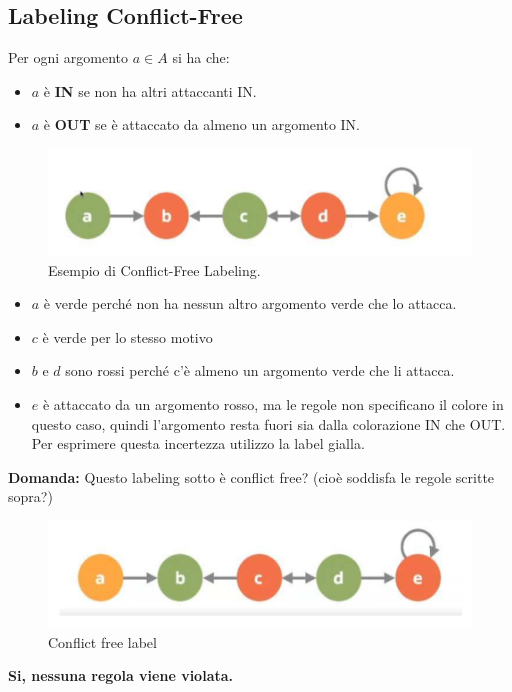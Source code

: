 \subsection{Labeling Conflict-Free}
Per ogni argomento $a \in A$ si ha che:
\begin{itemize}
    \item $a$ è \textbf{IN} se non ha altri attaccanti IN.
    \item $a$ è \textbf{OUT} se è attaccato da almeno un argomento IN.
\end{itemize}
\begin{figure}[H]
    \centering
    \includegraphics[width=12cm, keepaspectratio]{img/Cap7/CF.png}
    \caption{Esempio di Conflict-Free Labeling.}
\end{figure}
\begin{itemize}
    \item $a$ è verde perché non ha nessun altro argomento verde che lo
          attacca.
    \item $c$ è verde per lo stesso motivo
    \item $b$ e $d$ sono rossi perché c'è almeno un argomento verde che li
          attacca.
    \item $e$ è attaccato da un argomento rosso, ma le regole non
          specificano il colore in questo caso, quindi l'argomento resta fuori sia
          dalla colorazione IN che OUT. Per esprimere questa incertezza utilizzo
          la label gialla.
\end{itemize}
\textbf{Domanda: } Questo labeling sotto è conflict free? (cioè soddisfa le
regole scritte sopra?)
\begin{figure}[H]
    \centering
    \includegraphics[width=12cm, keepaspectratio]{img/Cap7/CF2.png}
    \caption{Conflict free label}
\end{figure}
\begin{center}
    \textbf{Si, nessuna regola viene violata.}
\end{center}

